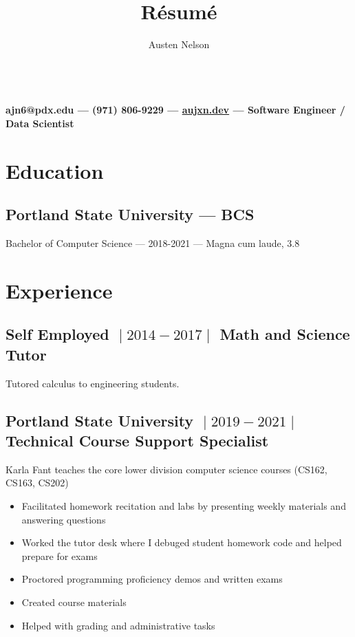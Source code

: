 \documentclass{article}
\title{R\'esum\'e}
\author{Austen Nelson}
\makeatletter
\renewcommand{\maketitle}
{
\begin{center}
\huge \bfseries \theauthor\\
\vspace{.25em}
   \mdseries \normalsize ajn6@pdx.edu --- (971) 806-9229 --- \href{aujxn.dev}{aujxn.dev} --- Software Engineer / Data Scientist
\end{center}
}
\makeatother
\begin{document}
\maketitle

\section{Education}

\subsection{Portland State University --- BCS}
Bachelor of Computer Science --- 2018-2021 --- Magna cum laude, 3.8

\section{Experience}

\subsection{Self Employed $\;\vert\;2014-2017\;\vert\;$ Math and Science Tutor}
Tutored calculus to engineering students.

\subsection{Portland State University $\;\vert\;2019-2021\;\vert\;$ Technical Course Support Specialist}
Karla Fant teaches the core lower division computer science courses (CS162, CS163, CS202)\\

\begin{itemize}
\item Facilitated homework recitation and labs by presenting weekly materials and answering questions
\item Worked the tutor desk where I debuged student homework code and helped prepare for exams
\item Proctored programming proficiency demos and written exams
\item Created course materials
\item Helped with grading and administrative tasks
\end{itemize}
\end{document}
